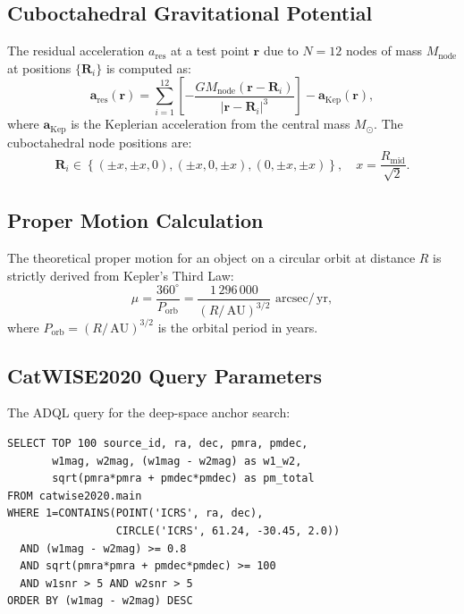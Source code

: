 \documentclass[11pt,a4paper]{article}
\theoremstyle{remark}
\newcommand{\AU}{\,\mathrm{AU}}
\newcommand{\yr}{\,\mathrm{yr}}
\newcommand{\arcsec}{\,\mathrm{arcsec}}
\begin{document}
\subsection{Cuboctahedral Gravitational Potential}

The residual acceleration $a_{\text{res}}$ at a test point $\mathbf{r}$ due to $N=12$ nodes of mass $M_{\text{node}}$ at positions $\{\mathbf{R}_i\}$ is computed as:
\begin{equation}
    \mathbf{a}_{\text{res}}(\mathbf{r}) = \sum_{i=1}^{12} \left[ -\frac{GM_{\text{node}}(\mathbf{r} - \mathbf{R}_i)}{|\mathbf{r} - \mathbf{R}_i|^3} \right] - \mathbf{a}_{\text{Kep}}(\mathbf{r}),
\end{equation}
where $\mathbf{a}_{\text{Kep}}$ is the Keplerian acceleration from the central mass $M_\odot$. The cuboctahedral node positions are:
\begin{equation}
    \mathbf{R}_i \in \left\{ (\pm x, \pm x, 0), (\pm x, 0, \pm x), (0, \pm x, \pm x) \right\}, \quad x = \frac{R_{\text{mid}}}{\sqrt{2}}.
\end{equation}

\subsection{Proper Motion Calculation}

The theoretical proper motion for an object on a circular orbit at distance $R$ is strictly derived from Kepler's Third Law:
\begin{equation}
    \mu = \frac{360^\circ}{P_{\text{orb}}} = \frac{1\,296\,000}{(R/\AU)^{3/2}} \,\arcsec/\yr,
\end{equation}
where $P_{\text{orb}} = (R/\AU)^{3/2}$ is the orbital period in years.

\subsection{CatWISE2020 Query Parameters}

The ADQL query for the deep-space anchor search:
\begin{verbatim}
SELECT TOP 100 source_id, ra, dec, pmra, pmdec, 
       w1mag, w2mag, (w1mag - w2mag) as w1_w2,
       sqrt(pmra*pmra + pmdec*pmdec) as pm_total
FROM catwise2020.main
WHERE 1=CONTAINS(POINT('ICRS', ra, dec), 
                 CIRCLE('ICRS', 61.24, -30.45, 2.0))
  AND (w1mag - w2mag) >= 0.8
  AND sqrt(pmra*pmra + pmdec*pmdec) >= 100
  AND w1snr > 5 AND w2snr > 5
ORDER BY (w1mag - w2mag) DESC
\end{verbatim}
\end{document}
